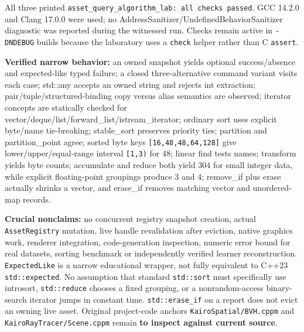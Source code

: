 All three printed \texttt{asset\_query\_algorithm\_lab:\ all\ checks\ passed}. GCC 14.2.0 and Clang 17.0.0 were used; no AddressSanitizer/UndefinedBehaviorSanitizer diagnostic was reported during the witnessed run. Checks remain active in \texttt{-DNDEBUG} builds because the laboratory uses a \texttt{check} helper rather than C \texttt{assert}.

\textbf{Verified narrow behavior:} an owned snapshot yields optional success/absence and expected-like typed failure; a closed three-alternative command variant visits each case; std::any accepts an owned string and rejects int extraction; pair/tuple/structured-binding copy versus alias semantics are observed; iterator concepts are statically checked for vector/deque/list/forward\_list/istream\_iterator; ordinary sort uses explicit byte/name tie-breaking; stable\_sort preserves priority ties; partition and partition\_point agree; sorted byte keys \texttt{{[}16,48,48,64,128{]}} give lower/upper/equal-range interval \texttt{{[}1,3)} for 48; linear find tests names; transform yields byte counts; accumulate and reduce both yield 304 for small integer data, while explicit floating-point groupings produce 3 and 4; remove\_if plus erase actually shrinks a vector, and erase\_if removes matching vector and unordered-map records.

\textbf{Crucial nonclaims:} no concurrent registry snapshot creation, actual \texttt{AssetRegistry} mutation, live handle revalidation after eviction, native graphics work, renderer integration, code-generation inspection, numeric error bound for real datasets, sorting benchmark or independently verified learner reconstruction. \texttt{ExpectedLike} is a narrow educational wrapper, not fully equivalent to C++23 \texttt{std::expected}. No assumption that standard \texttt{std::sort} must specifically use introsort, \texttt{std::reduce} chooses a fixed grouping, or a nonrandom-access binary-search iterator jumps in constant time. \texttt{std::erase\_if} on a report does not evict an owning live asset. Original project-code anchors \texttt{KairoSpatial/BVH.cppm} and \texttt{KairoRayTracer/Scene.cppm} remain \textbf{to inspect against current source}.

